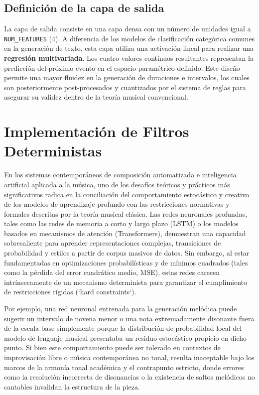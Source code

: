 \documentclass[12pt]{report}
\begin{document}
\subsection{Definición de la capa de salida}
La capa de salida consiste en una capa densa con un número de unidades igual a \texttt{NUM\_FEATURES} (4). A diferencia de los modelos de clasificación categórica comunes en la generación de texto, esta capa utiliza una activación lineal para realizar una \textbf{regresión multivariada}. Los cuatro valores continuos resultantes representan la predicción del próximo evento en el espacio paramétrico definido. Este diseño permite una mayor fluidez en la generación de duraciones e intervalos, los cuales son posteriormente post-procesados y cuantizados por el sistema de reglas para asegurar su validez dentro de la teoría musical convencional.

\section{Implementación de Filtros Deterministas}

En los sistemas contemporáneos de composición automatizada e inteligencia artificial aplicada a la música, uno de los desafíos teóricos y prácticos más significativos radica en la conciliación del comportamiento estocástico y creativo de los modelos de aprendizaje profundo con las restricciones normativas y formales descritas por la teoría musical clásica. Las redes neuronales profundas, tales como las redes de memoria a corto y largo plazo (LSTM) o los modelos basados en mecanismos de atención (Transformers), demuestran una capacidad sobresaliente para aprender representaciones complejas, transiciones de probabilidad y estilos a partir de corpus masivos de datos. Sin embargo, al estar fundamentadas en optimizaciones probabilísticas y de mínimos cuadrados (tales como la pérdida del error cuadrático medio, MSE), estas redes carecen intrínsecamente de un mecanismo determinista para garantizar el cumplimiento de restricciones rígidas (`hard constraints`). 

Por ejemplo, una red neuronal entrenada para la generación melódica puede sugerir un intervalo de novena menor o una nota extremadamente disonante fuera de la escala base simplemente porque la distribución de probabilidad local del modelo de lenguaje musical presentaba un residuo estocástico propicio en dicho punto. Si bien este comportamiento puede ser tolerado en contextos de improvisación libre o música contemporánea no tonal, resulta inaceptable bajo los marcos de la armonía tonal académica y el contrapunto estricto, donde errores como la resolución incorrecta de disonancias o la existencia de saltos melódicos no cantables invalidan la estructura de la pieza.
\end{document}
